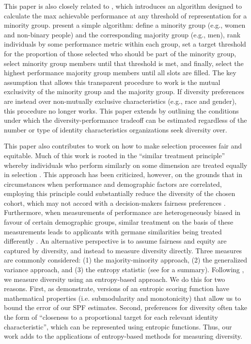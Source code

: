 This paper is also closely related to \textcite{kleinberg2018algorithmic}, which introduces an algorithm designed to calculate the max achievable performance at any threshold of representation for a minority group. \textcite{kleinberg2018algorithmic} present a simple algorithm: define a minority group (e.g., women and non-binary people) and the corresponding majority group (e.g., men), rank individuals by some performance metric within each group, set a target threshold for the proportion of those selected who should be part of the minority group, select minority group members until that threshold is met, and finally, select the highest performance majority group members until all slots are filled. The key assumption that allows this transparent procedure to work is the mutual exclusivity of the minority group and the majority group. If diversity preferences are instead over non-mutually exclusive characteristics (e.g., race and gender), this procedure no longer works. This paper extends \textcite{kleinberg2018algorithmic} by outlining the conditions under which the diversity-performance tradeoff can be estimated regardless of the number or type of identity characteristics organizations seek diversity over.

This paper also contributes to work on how to make selection processes fair and equitable. Much of this work is rooted in the ``similar treatment principle'' whereby individuals who perform similarly on some dimension are treated equally in selection \cite{dwork2012fairness}. This approach has been criticized, however, on the grounds that in circumstances when performance and demographic factors are correlated, employing this principle could substantially reduce the diversity of the chosen cohort, which may not accord with a decision-makers fairness preferences \cite{fleisher2021s}. Furthermore, when measurements of performance are heterogeneously biased in favour of certain demographic groups, similar treatment on the basis of these measurements leads to applicants with germane similarities being treated differently \cite{fleisher2021s}. An alternative perspective is to assume fairness and equity are captured by diversity, and instead to measure diversity directly. Three measures are commonly considered: (1) the majority-minority approach, (2) the generalized variance approach, and (3) the entropy statistic (see \textcite{budescu2012measure} for a summary). Following \textcite{huppenkothen2020entrofy}, we measure diversity using an entropy-based approach. We do this for two reasons. First, as \textcite{huppenkothen2020entrofy} demonstrate, versions of an entropic scoring function have mathematical properties (i.e. submodularity and monotonicity) that allow us to bound the error of our SPF estimates. Second, preferences for diversity often take the form of ``closeness to a proportional target for each relevant identity characteristic'', which can be represented using entropic functions. Thus, our work adds to the applications of entropy-based methods for measuring diversity.

